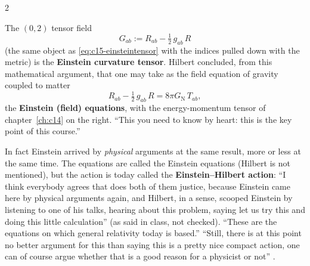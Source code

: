 \begin{paracol}{2}
\begin{definition}\label{def:c15-einstein}
The $(0,2)$ tensor field
\[
  G_{ab}:=R_{ab}-\tfrac12\,g_{ab}\,R
\]
(the same object as \eqref{eq:c15-einsteintensor} with the indices pulled down with the metric) is the \textbf{Einstein curvature tensor}. Hilbert concluded, from this mathematical argument, that one may take as the field equation of gravity coupled to matter
\[
  R_{ab}-\tfrac12\,g_{ab}\,R=8\pi G_{\mathrm N}\,T_{ab},
\]
the \textbf{Einstein (field) equations}, with the energy-momentum tensor of chapter~\ref{ch:c14} on the right. ``This you need to know by heart: this is the key point of this course.''
\end{definition}
In fact Einstein arrived by \emph{physical} arguments at the same result, more or less at the same time. The equations are called the Einstein equations (Hilbert is not mentioned), but the action is today called the \textbf{Einstein--Hilbert action}: ``I think everybody agrees that does both of them justice, because Einstein came here by physical arguments again, and Hilbert, in a sense, scooped Einstein by listening to one of his talks, hearing about this problem, saying let us try this and doing this little calculation'' (as said in class, not checked). ``These are the equations on which general relativity today is based.'' ``Still, there is at this point no better argument for this than saying this is a pretty nice compact action, one can of course argue whether that is a good reason for a physicist or not'' .


\end{paracol}
